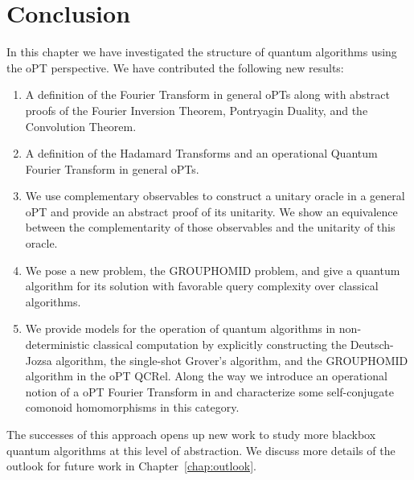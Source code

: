 \section{Conclusion}
In this chapter we have investigated the structure of quantum algorithms using the oPT perspective. We have contributed the following new results:
\begin{enumerate}
\item A definition of the Fourier Transform in general oPTs along with abstract proofs of the Fourier Inversion Theorem, Pontryagin Duality, and the Convolution Theorem.
\item A definition of the Hadamard Transforms and an operational Quantum Fourier Transform in general oPTs.
\item We use complementary observables to construct a unitary oracle in a general oPT and provide an abstract proof of its unitarity.  We show an equivalence between the complementarity of those observables and the unitarity of this oracle.
\item We pose a new problem, the GROUPHOMID problem, and give a quantum algorithm for its solution with favorable query complexity over classical algorithms.
\item We provide models for the operation of quantum algorithms in non-deterministic classical computation by explicitly constructing the Deutsch-Jozsa algorithm, the single-shot Grover's algorithm, and the GROUPHOMID algorithm in the oPT QCRel. Along the way we introduce an operational notion of a oPT Fourier Transform in  and characterize some self-conjugate comonoid homomorphisms in this category.
\end{enumerate}

The successes of this approach opens up new work to study more blackbox quantum algorithms at this level of abstraction. We discuss more details of the outlook for future work in Chapter~\ref{chap:outlook}. 

